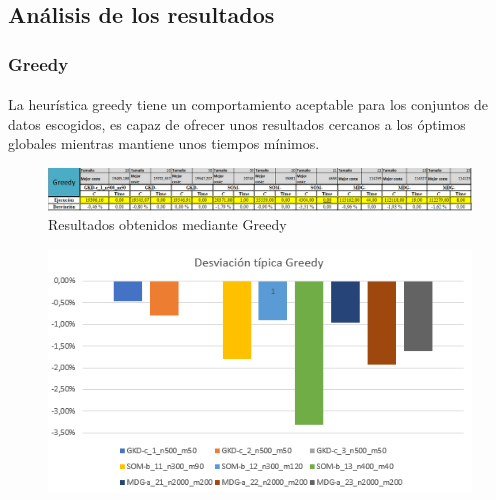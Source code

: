 \documentclass{article}
\begin{document}
	
	\subsection{Análisis de los resultados}
	
		\subsubsection{Greedy}
		
				\paragraph{}La heurística greedy tiene un comportamiento aceptable para los conjuntos de datos escogidos, es capaz de ofrecer unos resultados cercanos a los óptimos globales mientras mantiene unos tiempos mínimos.
			
			\begin{figure}[H]
				
				\centering
				\includegraphics[scale=0.4]{img/greegyResult}
				\caption{Resultados obtenidos mediante Greedy}
				
			\end{figure}
		
			\begin{figure}[H]
				
				\centering
				\includegraphics[scale=0.4]{img/DTGreedy}
				
			\end{figure}
		
\end{document}
